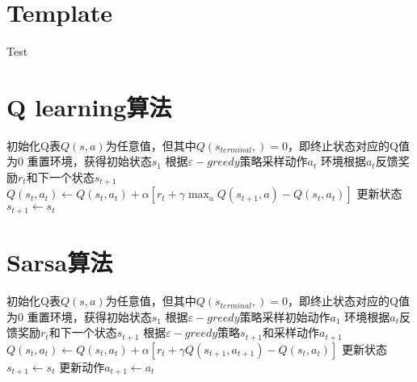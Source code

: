 \documentclass[11pt]{ctexart}
\begin{document}
\tableofcontents %
\clearpage
\section{Template}
\begin{algorithm}[H] %
	\renewcommand{\thealgorithm}{} %
	\caption{} 
	\begin{algorithmic}[1] %
		\STATE Test
	\end{algorithmic}
\end{algorithm}
\clearpage
\section{Q learning算法}
\begin{algorithm}[H] %
	\renewcommand{\thealgorithm}{} %
	\caption{} 
	\begin{algorithmic}[1] %
		\STATE 初始化Q表$Q(s,a)$为任意值，但其中$Q(s_{terminal},)=0$，即终止状态对应的Q值为0
			\STATE 重置环境，获得初始状态$s_1$
				\STATE 根据$\varepsilon-greedy$策略采样动作$a_t$
				\STATE 环境根据$a_t$反馈奖励$r_t$和下一个状态$s_{t+1}$
				\STATE $Q(s_t,a_t) \leftarrow Q(s_t,a_t)+\alpha[r_t+\gamma\max _{a}Q(s_{t+1},a)-Q(s_t,a_t)]$
				\STATE 更新状态$s_{t+1} \leftarrow s_t$
			\ENDFOR
		\ENDFOR
	\end{algorithmic}
\end{algorithm}
\clearpage

\section{Sarsa算法}
\begin{algorithm}[H] %
	\renewcommand{\thealgorithm}{} %
	\caption{} 
	\begin{algorithmic}[1] %
		\STATE 初始化Q表$Q(s,a)$为任意值，但其中$Q(s_{terminal},)=0$，即终止状态对应的Q值为0
			\STATE 重置环境，获得初始状态$s_1$
			\STATE 根据$\varepsilon-greedy$策略采样初始动作$a_1$
				\STATE 环境根据$a_t$反馈奖励$r_t$和下一个状态$s_{t+1}$
				\STATE 根据$\varepsilon-greedy$策略$s_{t+1}$和采样动作$a_{t+1}$
				\STATE $Q(s_t,a_t) \leftarrow Q(s_t,a_t)+\alpha[r_t+\gamma Q(s_{t+1},a_{t+1})-Q(s_t,a_t)]$
				\STATE 更新状态$s_{t+1} \leftarrow s_t$
				\STATE 更新动作$a_{t+1} \leftarrow a_t$
			\ENDFOR
		\ENDFOR
	\end{algorithmic}
\end{algorithm}
\clearpage
\end{document}
